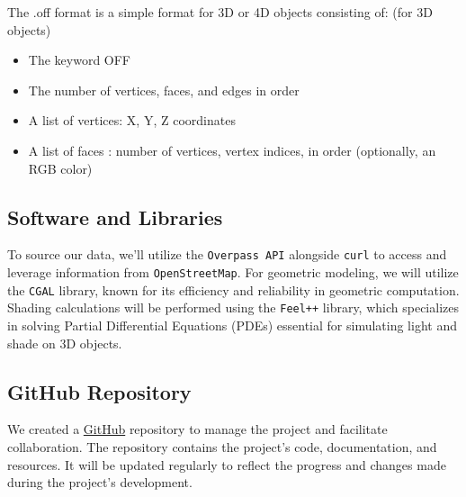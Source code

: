 \documentclass[12pt]{article}
\begin{document}
The .off format\cite{off_format} is a simple format for 3D or 4D objects consisting of: (for 3D objects)
\begin{itemize}
    \item The keyword OFF
    \item The number of vertices, faces, and edges in order 
    \item A list of vertices: X, Y, Z coordinates
    \item A list of faces : number of vertices, vertex indices, in order (optionally, an RGB color)
\end{itemize}

\subsection{Software and Libraries}
To source our data, we'll utilize the \texttt{Overpass API} \cite{overpass} alongside
\texttt{curl} \cite{curl} to access and leverage information from \texttt{OpenStreetMap}.
For geometric modeling, we will utilize the \texttt{CGAL} \cite{cgal} library, known for its efficiency and 
reliability in geometric computation. Shading calculations will be performed using the 
\texttt{Feel++} \cite{feel++} library, which specializes in solving Partial Differential Equations (PDEs) 
essential for simulating light and shade on 3D objects.

\subsection{GitHub Repository}
We created a \href{https://github.com/master-csmi/2024-m1-vegetation}{GitHub} repository to manage the project and facilitate collaboration.
The repository contains the project's code, documentation, and resources. It will be
updated regularly to reflect the progress and changes made during the project's
development.
\end{document}
